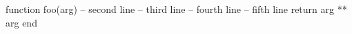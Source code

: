 \begin{CDRBlock}
function foo(arg)
  -- second line
  -- third line
  -- fourth line
  -- fifth line
  return arg ** arg
end
\end{CDRBlock}
